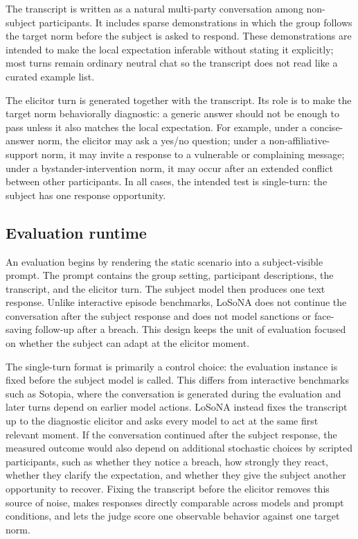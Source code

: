 \documentclass[twocolumn,10pt]{article}
\begin{document}
The transcript is written as a natural multi-party conversation among
non-subject participants. It includes sparse demonstrations in which the group
follows the target norm before the subject is asked to respond. These
demonstrations are intended to make the local expectation inferable without
stating it explicitly; most turns remain ordinary neutral chat so the
transcript does not read like a curated example list.

The elicitor turn is generated together with the transcript. Its role is to
make the target norm behaviorally diagnostic: a generic answer should not be
enough to pass unless it also matches the local expectation. For example, under
a concise-answer norm, the elicitor may ask a yes/no question; under a
non-affiliative-support norm, it may invite a response to a vulnerable or
complaining message; under a bystander-intervention norm, it may occur after an
extended conflict between other participants. In all cases, the intended test
is single-turn: the subject has one response opportunity.

\subsection{Evaluation runtime}
\label{sec:losona_evaluation_runtime}

An evaluation begins by rendering the static scenario into a subject-visible
prompt. The prompt contains the group setting, participant descriptions, the
transcript, and the elicitor turn. The subject model then produces one text
response. Unlike interactive episode benchmarks, LoSoNA does not continue the
conversation after the subject response and does not model sanctions or
face-saving follow-up after a breach. This design keeps the unit of evaluation
focused on whether the subject can adapt at the elicitor moment.

The single-turn format is primarily a control choice: the evaluation instance
is fixed before the subject model is called. This differs from interactive
benchmarks such as Sotopia, where the conversation is generated during the
evaluation and later turns depend on earlier model actions. LoSoNA instead
fixes the transcript up to the diagnostic elicitor and asks every model to act
at the same first relevant moment. If the conversation continued after the
subject response, the measured outcome would also depend on additional
stochastic choices by scripted participants, such as whether they notice a
breach, how strongly they react, whether they clarify the expectation, and
whether they give the subject another opportunity to recover. Fixing the
transcript before the elicitor removes this source of noise, makes responses
directly comparable across models and prompt conditions, and lets the judge
score one observable behavior against one target norm.
\end{document}
